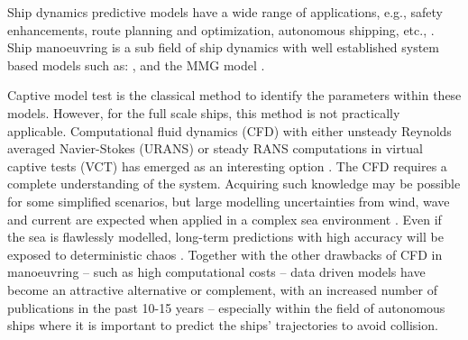 Ship dynamics predictive models have a wide range of applications, e.g., safety enhancements, route planning and optimization, autonomous shipping, etc., \citep{aslam_internet_2020}.
Ship manoeuvring is a sub field of ship dynamics with well established system based models such as: \citet{abkowitz_ship_1964,nomoto_steering_1957,norrbin_theory_1971}, and the MMG model \citep{yasukawa_introduction_2015}.

Captive model test is the classical method to identify the parameters within these models. However, for the full scale ships, this method is not practically applicable. Computational fluid dynamics (CFD) with either unsteady Reynolds averaged Navier-Stokes (URANS) or steady RANS computations in virtual captive tests (VCT) has emerged as an interesting option \citep{liu_predictions_2018,li_ship_2022}.
The CFD requires a complete understanding of the system. Acquiring such knowledge may be possible for some simplified scenarios, but large modelling uncertainties from wind, wave and current are expected when applied in a complex sea environment \citep{miller_ship_2021}. 
Even if the sea is flawlessly modelled, long-term predictions with high accuracy will be exposed to deterministic chaos \citep{lorenz_deterministic_1963}.
Together with the other drawbacks of CFD in manoeuvring -- such as high computational costs -- data driven models have become an attractive alternative or complement, with an increased number of publications in the past 10-15 years %
-- especially within the field of autonomous ships \citep{ahmed_survey_2023} where it is important to predict the ships’ trajectories to avoid collision. 

